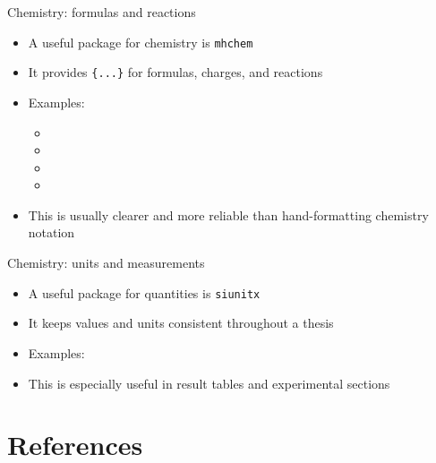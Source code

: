 \documentclass{beamer}
\begin{document}
\begin{frame}[fragile]{Chemistry: formulas and reactions}
    \begin{itemize}
        \item A useful package for chemistry is \texttt{mhchem}
        \item It provides \texttt{\string\ce\{...\}} for formulas, charges, and reactions
        \item Examples:
              \begin{itemize}
                  \item {}
                  \item {}
                  \item {}
                  \item {}
              \end{itemize}
        \item This is usually clearer and more reliable than hand-formatting chemistry notation
    \end{itemize}
\end{frame}

\begin{frame}[fragile]{Chemistry: units and measurements}
    \begin{itemize}
        \item A useful package for quantities is \texttt{siunitx}
        \item It keeps values and units consistent throughout a thesis
        \item Examples:
        \item This is especially useful in result tables and experimental sections
    \end{itemize}
\end{frame}

\section{References}
\end{document}
